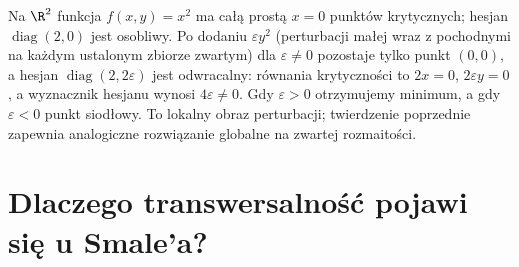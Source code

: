 \begin{przyklad}
Na $\R^2$ funkcja $f(x,y)=x^2$ ma całą prostą
$x=0$ punktów krytycznych; hesjan
$\operatorname{diag}(2,0)$ jest osobliwy.
Po dodaniu $\varepsilon y^2$ (perturbacji małej wraz
z pochodnymi na każdym ustalonym zbiorze zwartym) dla
$\varepsilon\ne0$ pozostaje tylko punkt
$(0,0)$, a hesjan
$\operatorname{diag}(2,2\varepsilon)$
jest odwracalny: równania krytyczności to
$2x=0$, $2\varepsilon y=0$, a wyznacznik hesjanu wynosi
$4\varepsilon\ne0$.
Gdy $\varepsilon>0$
otrzymujemy minimum, a gdy
$\varepsilon<0$ punkt siodłowy.
To lokalny obraz perturbacji; twierdzenie
poprzednie zapewnia analogiczne
rozwiązanie globalne na zwartej rozmaitości.
\end{przyklad}

\section{Dlaczego transwersalność pojawi się u Smale'a?}
\label{sec:transwersalnosc-smale}

